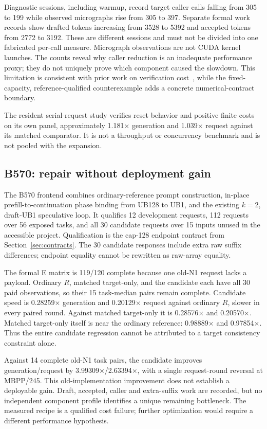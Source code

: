 Diagnostic sessions, including warmup, record target caller calls falling from 305 to 199 while observed micrographs rise from 305 to 397. Separate formal work records show drafted tokens increasing from 3528 to 5392 and accepted tokens from 2772 to 3192. These are different sessions and must not be divided into one fabricated per-call measure. Micrograph observations are not CUDA kernel launches. The counts reveal why caller reduction is an inadequate performance proxy; they do not uniquely prove which component caused the slowdown. This limitation is consistent with prior work on verification cost~\cite{illusion}, while the fixed-capacity, reference-qualified counterexample adds a concrete numerical-contract boundary.

The resident serial-request study verifies reset behavior and positive finite costs on its own panel, approximately 1.181$\times$ generation and 1.039$\times$ request against its matched comparator. It is not a throughput or concurrency benchmark and is not pooled with the expansion.

\subsection{B570: repair without deployment gain}
The B570 frontend combines ordinary-reference prompt construction, in-place prefill-to-continuation phase binding from UB128 to UB1, and the existing $k=2$, draft-UB1 speculative loop. It qualifies 12 development requests, 112 requests over 56 exposed tasks, and all 30 candidate requests over 15 inputs unused in the accessible project. Qualification is the cap-128 endpoint contract from Section~\ref{sec:contracts}. The 30 candidate responses include extra raw suffix differences; endpoint equality cannot be rewritten as raw-array equality.

The formal E matrix is 119/120 complete because one old-N1 request lacks a payload. Ordinary $R$, matched target-only, and the candidate each have all 30 paid observations, so their 15 task-median pairs remain complete. Candidate speed is 0.28259$\times$ generation and 0.20129$\times$ request against ordinary $R$, slower in every paired round. Against matched target-only it is 0.28576$\times$ and 0.20570$\times$. Matched target-only itself is near the ordinary reference: 0.98889$\times$ and 0.97854$\times$. Thus the entire candidate regression cannot be attributed to a target consistency constraint alone.

Against 14 complete old-N1 task pairs, the candidate improves generation/request by 3.99309$\times$/2.63394$\times$, with a single request-round reversal at MBPP/245. This old-implementation improvement does not establish a deployable gain. Draft, accepted, caller and extra-suffix work are recorded, but no independent component profile identifies a unique remaining bottleneck. The measured recipe is a qualified cost failure; further optimization would require a different performance hypothesis.

